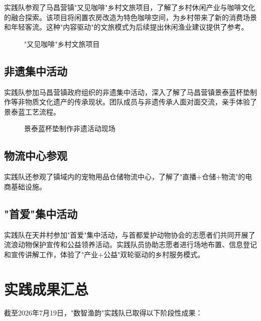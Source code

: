 \documentclass[12pt,a4paper]{article}
\begin{document}
实践队参观了马昌营镇"又见咖啡"乡村文旅项目，了解了乡村休闲产业与咖啡文化的融合探索。该项目将闲置农房改造为特色咖啡空间，为乡村带来了新的消费场景和年轻客流。这种"内容驱动"的文旅模式为后续提出休闲渔业建议提供了参考。

\begin{figure}[H]
\centering
{}
\caption{"又见咖啡"乡村文旅项目}
\end{figure}

\subsection{非遗集中活动}

实践队参加马昌营镇政府组织的非遗集中活动，深入了解了马昌营镇景泰蓝杯垫制作等非物质文化遗产的传承现状。团队成员与非遗传承人面对面交流，亲手体验了景泰蓝工艺流程。

\begin{figure}[H]
\centering
{}
\caption{景泰蓝杯垫制作非遗活动现场}
\end{figure}

\subsection{物流中心参观}

实践队还参观了镇域内的宠物用品仓储物流中心，了解了"直播+仓储+物流"的电商基础设施。

\subsection{"首爱"集中活动}

实践队在天井村参加"首爱"集中活动，与首都爱护动物协会的志愿者们共同开展了流浪动物保护宣传和公益领养活动。实践队员协助志愿者进行场地布置、信息登记和宣传讲解工作，体验了"产业+公益"双轮驱动的乡村服务模式。

\section{实践成果汇总}

截至2026年7月19日，"数智渔韵"实践队已取得以下阶段性成果：
\end{document}
